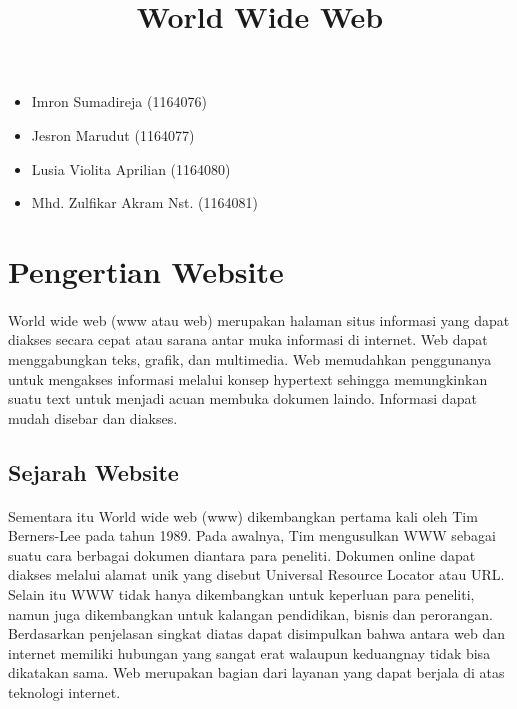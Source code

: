 \documentclass[12pt, a4paper]{article}
\begin{document}
\title{World Wide Web}
\maketitle

\begin{itemize}
\item Imron Sumadireja (1164076) \\
\item Jesron Marudut (1164077) \\
\item Lusia Violita Aprilian (1164080) \\
\item Mhd. Zulfikar Akram Nst. (1164081) \\
\end{itemize}

\section{Pengertian Website}
\paragraph{}World wide web (www atau web) merupakan halaman situs informasi yang dapat diakses secara cepat atau sarana
antar muka informasi di internet. Web dapat menggabungkan teks, grafik, dan multimedia. Web memudahkan
penggunanya untuk mengakses informasi melalui konsep hypertext sehingga memungkinkan  suatu text untuk
menjadi acuan membuka dokumen laindo. Informasi dapat mudah disebar dan diakses.

\subsection{Sejarah Website}
\paragraph{}Sementara itu World wide web (www) dikembangkan pertama kali oleh Tim Berners-Lee pada tahun 1989. Pada
awalnya, Tim mengusulkan WWW sebagai suatu cara berbagai dokumen diantara para peneliti. Dokumen online dapat
diakses melalui alamat unik yang disebut Universal Resource Locator atau URL. Selain itu WWW tidak hanya
dikembangkan untuk keperluan para peneliti, namun juga dikembangkan untuk kalangan pendidikan, bisnis dan
perorangan. Berdasarkan penjelasan singkat diatas dapat disimpulkan bahwa antara web dan internet memiliki
hubungan yang sangat erat walaupun keduangnay tidak bisa dikatakan sama. Web merupakan bagian dari layanan
yang dapat berjala di atas teknologi internet.
\end{document}
